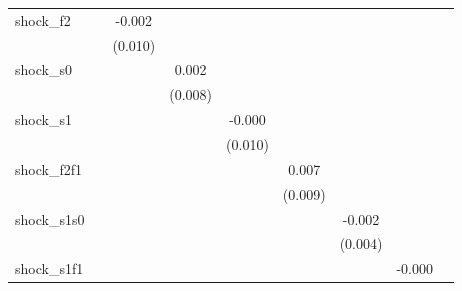 {\begin{tabular}{l*{8}{c}}
\addlinespace
shock\_f2    &                     &      -0.002         &                     &                     &                     &                     &                     &                     \\
            &                     &     (0.010)         &                     &                     &                     &                     &                     &                     \\
\addlinespace
shock\_s0    &                     &                     &       0.002         &                     &                     &                     &                     &                     \\
            &                     &                     &     (0.008)         &                     &                     &                     &                     &                     \\
\addlinespace
shock\_s1    &                     &                     &                     &      -0.000         &                     &                     &                     &                     \\
            &                     &                     &                     &     (0.010)         &                     &                     &                     &                     \\
\addlinespace
shock\_f2f1  &                     &                     &                     &                     &       0.007         &                     &                     &                     \\
            &                     &                     &                     &                     &     (0.009)         &                     &                     &                     \\
\addlinespace
shock\_s1s0  &                     &                     &                     &                     &                     &      -0.002         &                     &                     \\
            &                     &                     &                     &                     &                     &     (0.004)         &                     &                     \\
\addlinespace
shock\_s1f1  &                     &                     &                     &                     &                     &                     &      -0.000         &                     \\

\end{tabular}}
